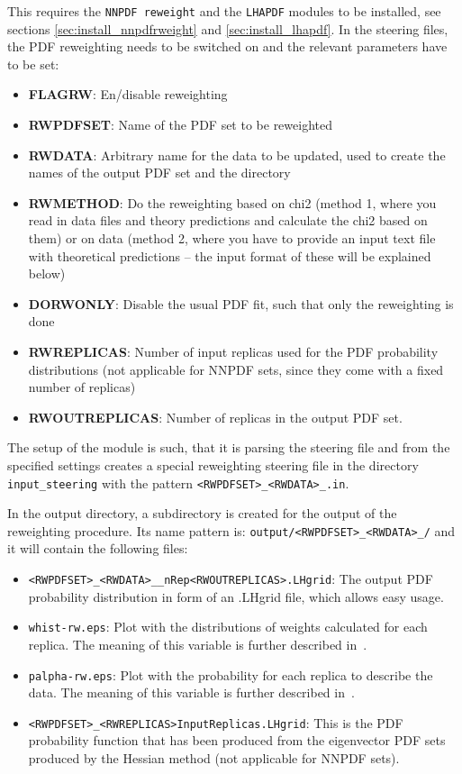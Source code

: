 This requires the {\tt NNPDF reweight} and the {\tt LHAPDF} modules to be installed, see sections \ref{sec:install_nnpdfrweight} and \ref{sec:install_lhapdf}. In the \fitter steering files, the PDF reweighting needs to be switched on and the relevant parameters have to be set: 

\begin{itemize}
 \item \textbf{FLAGRW}: En/disable reweighting
 \item \textbf{RWPDFSET}: Name of the PDF set to be reweighted
 \item \textbf{RWDATA}: Arbitrary name for the data to be updated, used to create the names of the output PDF set and the directory
 \item \textbf{RWMETHOD}: Do the reweighting based on chi2 (method 1, where you read in \fitter data files and theory predictions and calculate the chi2 based on them) or on data (method 2, where you have to provide an input text file with theoretical predictions {--} the input format of these will be explained below)
 \item \textbf{DORWONLY}: Disable the usual PDF fit, such that only the reweighting is done 
 \item \textbf{RWREPLICAS}: Number of input replicas used for the PDF probability distributions (not applicable for NNPDF sets, since they come with a fixed number of replicas)
 \item \textbf{RWOUTREPLICAS}: Number of replicas in the output PDF set.
\end{itemize}

The setup of the module is such, that it is parsing the \fitter steering file and from the specified settings creates a special reweighting steering file in the directory {\tt input\_steering} with the pattern {\tt <RWPDFSET>\_<RWDATA>\_<RWMETHOD: chi2 or data>.in}. 

In the output directory, a subdirectory is created for the output of the reweighting procedure. Its name pattern is: {\tt output/<RWPDFSET>\_<RWDATA>\_<RWMETHOD: chi2 or data>/} and it will contain the following files:

\begin{itemize}
 \item {\tt <RWPDFSET>\_<RWDATA>\_<RWMETHOD: chi2 or data>\_nRep<RWOUTREPLICAS>.LHgrid}: The output PDF probability distribution in form of an .LHgrid file, which allows easy usage.
 \item {\tt whist-rw.eps}: Plot with the distributions of weights calculated for each replica. The meaning of this variable is further described in~\cite{Ball:2011gg,Ball:2010gb}.
 \item {\tt palpha-rw.eps}: Plot with the probability for each replica to describe the data. The meaning of this variable is further described in~\cite{Ball:2011gg,Ball:2010gb}.
 \item {\tt <RWPDFSET>\_<RWREPLICAS>InputReplicas.LHgrid}: This is the PDF probability function that has been produced from the eigenvector PDF sets produced by the Hessian method (not applicable for NNPDF sets).
\end{itemize}

